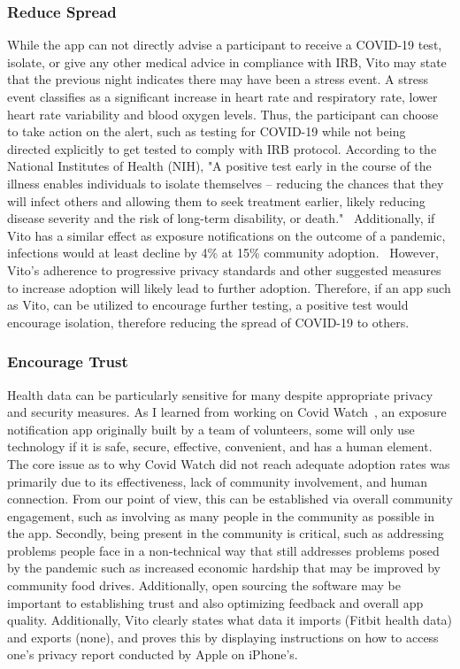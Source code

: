 \documentclass{article}
\begin{document}
\subsubsection{Reduce Spread}
While the app can not directly advise a participant to receive a COVID-19 test, isolate, or give any other medical advice in compliance with IRB, Vito may state that the previous night indicates there may have been a stress event.  A stress event classifies as a significant increase in heart rate and respiratory rate, lower heart rate variability and blood oxygen levels.  Thus, the participant can choose to take action on the alert, such as testing for COVID-19 while not being directed explicitly to get tested to comply with IRB protocol. According to the National Institutes of Health (NIH), "A positive test early in the course of the illness enables individuals to isolate themselves – reducing the chances that they will infect others and allowing them to seek treatment earlier, likely reducing disease severity and the risk of long-term disability, or death."~\cite{nih}  Additionally, if Vito has a similar effect as exposure notifications on the outcome of a pandemic, infections would at least decline by 4\% at 15\% community adoption.~\cite{en} However, Vito's adherence to progressive privacy standards and other suggested measures to increase adoption will likely lead to further adoption.          
Therefore, if an app such as Vito, can be utilized to encourage further testing, a positive test would encourage isolation, therefore reducing the spread of COVID-19 to others.

\subsubsection{Encourage Trust}
Health data can be particularly sensitive for many despite appropriate privacy and security measures.  As I learned from working on Covid Watch~\cite{covidwatch}, an exposure notification app originally built by a team of volunteers, some will only use technology if it is safe, secure, effective, convenient, and has a human element.  The core issue as to why Covid Watch did not reach adequate adoption rates was primarily due to its effectiveness, lack of community involvement, and human connection.  
From our point of view, this can be established via overall community engagement, such as involving as many people in the community as possible in the app.  Secondly, being present in the community is critical, such as addressing problems people face in a non-technical way that still addresses problems posed by the pandemic such as increased economic hardship that may be improved by community food drives.  Additionally, open sourcing the software may be important to establishing trust and also optimizing feedback and overall app quality.  Additionally, Vito clearly states what data it imports (Fitbit health data) and exports (none), and proves this by displaying instructions on how to access one's privacy report conducted by Apple on iPhone's.
\end{document}
